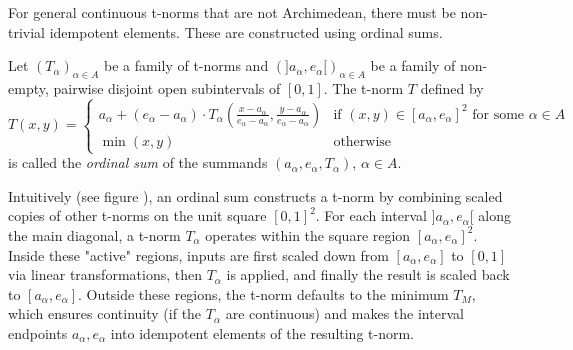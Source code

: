 For general continuous t-norms that are not Archimedean, there must be non-trivial idempotent elements. These are constructed using ordinal sums.
\begin{definition}
Let $(T_\alpha)_{\alpha \in A}$ be a family of t-norms and $(]a_\alpha, e_\alpha[)_{\alpha \in A}$ be a family of non-empty, pairwise disjoint open subintervals of $[0,1]$. The t-norm $T$ defined by
\[
T(x,y) =
\begin{cases}
  a_\alpha + (e_\alpha - a_\alpha) \cdot T_\alpha \left( \frac{x-a_\alpha}{e_\alpha - a_\alpha}, \frac{y-a_\alpha}{e_\alpha - a_\alpha} \right) & \text{if } (x,y) \in [a_\alpha, e_\alpha]^2 \text{ for some } \alpha \in A \\
  \min(x,y) & \text{otherwise}
\end{cases}
\]
is called the \emph{ordinal sum} of the summands $(a_\alpha, e_\alpha, T_\alpha)$, $\alpha \in A$.
\end{definition}
Intuitively (see figure ), an ordinal sum constructs a t-norm by combining scaled copies of other t-norms on the unit square $[0,1]^2$. For each interval $]a_\alpha, e_\alpha[$ along the main diagonal, a t-norm $T_\alpha$ operates within the square region $[a_\alpha, e_\alpha]^2$. Inside these "active" regions, inputs are first scaled down from $[a_\alpha, e_\alpha]$ to $[0,1]$ via linear transformations, then $T_\alpha$ is applied, and finally the result is scaled back to $[a_\alpha, e_\alpha]$. Outside these regions, the t-norm defaults to the minimum $T_M$, which ensures continuity (if the $T_\alpha$ are continuous) and makes the interval endpoints $a_\alpha, e_\alpha$ into idempotent elements of the resulting t-norm.

